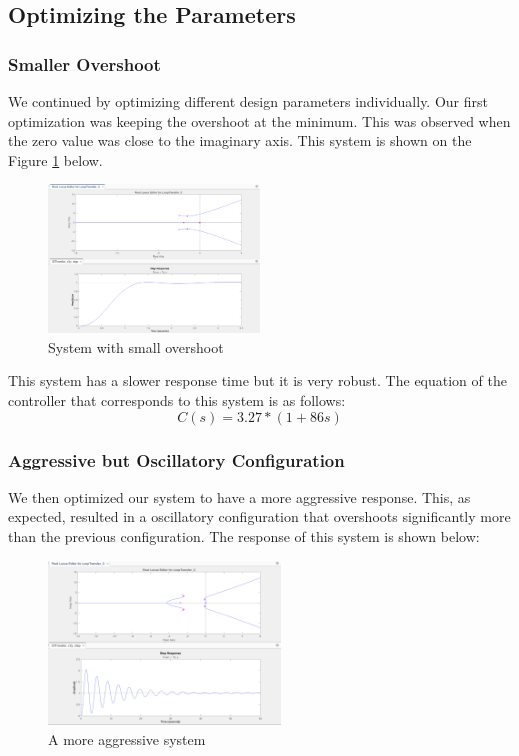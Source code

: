 \subsection{Optimizing the Parameters }
\subsubsection{Smaller Overshoot}
We continued by optimizing different design parameters individually. Our first optimization was keeping the overshoot at the minimum. This was observed when the zero value was close to the imaginary axis. This system is shown on the Figure \ref{fig:overs} below.

\begin{figure}[H]
    \centering
    \includegraphics[width=0.5\textwidth]{images/minimum overshoot.png}
    \caption{System with small overshoot}
    \label{fig:overs}
\end{figure}

This system has a slower response time but it is very robust. The equation of the controller that corresponds to this system is as follows:
\begin{equation}
    C(s) = 3.27 * (1 + 86s)
\end{equation}


\subsubsection{Aggressive but Oscillatory Configuration}
We then optimized our system to have a more aggressive response. This, as expected, resulted in a oscillatory configuration that overshoots significantly more than the previous configuration. The response of this system is shown below:
\begin{figure}[H]
    \centering
    \includegraphics[width=0.55\textwidth]{images/oscillatory.png}
    \caption{A more aggressive system}
    \label{fig:agg}
\end{figure}

